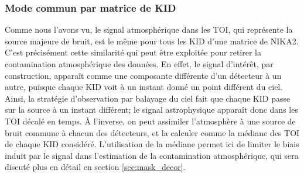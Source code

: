 \subsubsection{Mode commun par matrice de KID} %
Comme nous l'avons vu, le signal atmosphérique dans les TOI, qui représente la source majeure de bruit, est le même pour tous les KID d'une matrice de NIKA2.
C'est précisément cette similarité qui peut être exploitée pour retirer la contamination atmosphérique des données.
En effet, le signal d'intérêt, par construction, apparaît comme une composante différente d'un détecteur à un autre, puisque chaque KID voit à un instant donné un point différent du ciel.
Ainsi, la stratégie d'observation par balayage du ciel fait que chaque KID passe sur la source à un instant différent; le signal astrophysique apparaît donc dans les TOI décalé en temps.
À l'inverse, on peut assimiler l'atmosphère à une source de bruit commune à chacun des détecteurs, et la calculer comme la médiane des TOI de chaque KID considéré\footnotemark.
L'utilisation de la médiane permet ici de limiter le biais induit par le signal dans l'estimation de la contamination atmosphérique, qui sera discuté plus en détail en section \ref{sec:mask_decor}.

